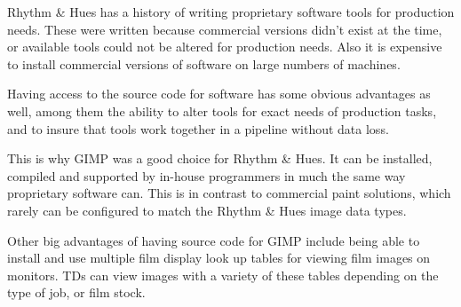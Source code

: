 Rhythm \& Hues has a history of writing proprietary software tools for
production needs. These were written because commercial versions didn't exist
at the time, or available tools could not be altered for production needs.
Also it is expensive to install commercial versions of software on large
numbers of machines.

Having access to the source code for software has some obvious advantages as
well, among them the ability to alter tools for exact needs of production
tasks, and to insure that tools work together in a pipeline without data loss. 

This is why GIMP was a good choice for Rhythm \& Hues. It can be installed,
compiled and supported by in-house programmers in much the same way proprietary
software can.  This is in contrast to commercial paint solutions, which rarely
can be configured to match the Rhythm \& Hues image data types.

Other big advantages of having source code for GIMP include being able to
install and use multiple film display look up tables for viewing film images on
monitors. TDs can view images with a variety of these tables depending on the
type of job, or film stock.

